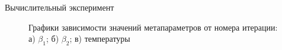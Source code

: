 \documentclass[10pt, aspectratio=169]{beamer}
\begin{document}
\begin{frame}{Вычислительный эксперимент}
\fontsize{6}{5}\selectfont
\begin{figure}
    \caption*{\fontsize{8}{5}\selectfont
    Графики зависимости значений метапараметров от номера итерации: а) $\beta_1$; б) $\beta_2$; в) температуры}
    \vspace{-0.3 cm}
    \begin{minipage}[h]{0.325\linewidth}
    \end{minipage}
    \begin{minipage}[h]{0.325\linewidth}

\end{minipage}
\end{figure}
\end{frame}
\end{document}

